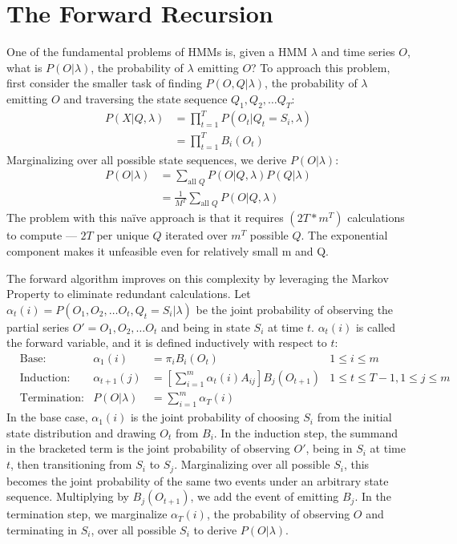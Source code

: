 \section{The Forward Recursion}
One of the fundamental problems of HMMs is, given a HMM $\lambda$ and time series $O$, what is $P(O|\lambda)$, the probability of $\lambda$ emitting $O$? To approach this problem, first consider the smaller task of finding $P(O, Q| \lambda)$, the probability of $\lambda$ emitting $O$ and traversing the state sequence $Q_1, Q_2, \dots Q_T$:
\begin{align*}
P(X|Q, \lambda) & = \prod_{t=1}^T P(O_t|Q_t = S_i, \lambda) \\
				& = \prod_{t=1}^T B_i(O_t)
\end{align*}
Marginalizing over all possible state sequences, we derive $P(O|\lambda)$:
\begin{align*}
P(O|\lambda) & = \sum_{\textrm{all $Q$}} P(O|Q, \lambda)P(Q|\lambda) \\
			 & = \frac{1}{M^T} \sum_{\textrm{all $Q$}} P(O|Q, \lambda)
\end{align*}
The problem with this na\"ive approach is that it requires $(2T*m^T)$ calculations to compute --- $2T$ per unique $Q$ iterated over $m^T$ possible $Q$. The exponential component makes it unfeasible even for relatively small m and Q.

The forward algorithm improves on this complexity by leveraging the Markov Property to eliminate redundant calculations. Let $\alpha_t(i) = P(O_1, O_2, \dots O_t, Q_t = S_i | \lambda)$ be the joint probability of observing the partial series $O' = O_1, O_2, \dots O_t$ and being in state $S_i$ at time $t$. $\alpha_t(i)$ is called the forward variable, and it is defined inductively with respect to $t$:
\begin{align*}
	& \text{Base:} & \alpha_1(i) & = \pi_iB_i(O_t) & 1 \leq i \leq m\\
	& \text{Induction:} & \alpha_{t+1}(j) & = \left[\sum_{i=1}^m \alpha_t(i)A_{ij}\right]B_j(O_{t+1}) & 1 \leq t \leq T-1, 1 \leq j \leq m \\
	& \text{Termination:} & P(O|\lambda) & = \sum_{i=1}^m \alpha_T(i)
\end{align*}
In the base case, $\alpha_1(i)$ is the joint probability of choosing $S_i$ from the initial state distribution and drawing $O_t$ from $B_i$. In the induction step, the summand in the bracketed term is the joint probability of observing $O'$, being in $S_i$ at time $t$, then transitioning from $S_i$ to $S_j$. Marginalizing over all possible $S_i$, this becomes the joint probability of the same two events under an arbitrary state sequence. Multiplying by $B_j(O_{t+1})$, we add the event of emitting $B_j$. In the termination step, we marginalize $\alpha_T(i)$, the probability of observing $O$ and terminating in $S_i$, over all possible $S_i$ to derive $P(O|\lambda)$.

